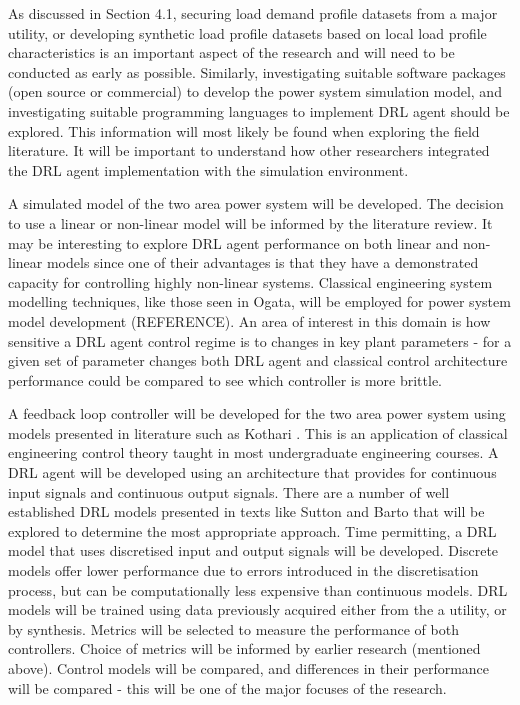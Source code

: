As discussed in Section 4.1, securing load demand profile datasets from a major utility, or developing synthetic load profile datasets based on local load profile characteristics is an important aspect of the research and will need to be conducted as early as possible. Similarly, investigating suitable software packages (open source or commercial) to develop the power system simulation model, and investigating suitable programming languages to implement DRL agent should be explored. This information will most likely be found when exploring the field literature. It will be important to understand how other researchers integrated the DRL agent implementation with the simulation environment.

A simulated model of the two area power system will be developed. The decision to use a linear or non-linear model will be informed by the literature review. It may be interesting to explore DRL agent performance on both linear and non-linear models since one of their advantages is that they have a demonstrated capacity for controlling highly non-linear systems. Classical engineering system modelling techniques, like those seen in Ogata, will be employed for power system model development (REFERENCE). An area of interest in this domain is how sensitive a DRL agent control regime is to changes in key plant parameters - for a given set of parameter changes both DRL agent and classical control architecture performance could be compared to see which controller is more brittle.

A feedback loop controller will be developed for the two area power system using models presented in literature such as Kothari \cite{Kothari2011}. This is an application of classical engineering control theory taught in most undergraduate engineering courses. A DRL agent will be developed using an architecture that provides for continuous input signals and continuous output signals. There are a number of well established DRL models presented in texts like Sutton and Barto that will be explored to determine the most appropriate approach. Time permitting, a DRL model that uses discretised input and output signals will be developed. Discrete models offer lower performance due to errors introduced in the discretisation process, but can be computationally less expensive than continuous models. DRL models will be trained using data previously acquired either from the a utility, or by synthesis. Metrics will be selected to measure the performance of both controllers. Choice of metrics will be informed by earlier research (mentioned above). Control models will be compared, and differences in their performance will be compared - this will be one of the major focuses of the research.

